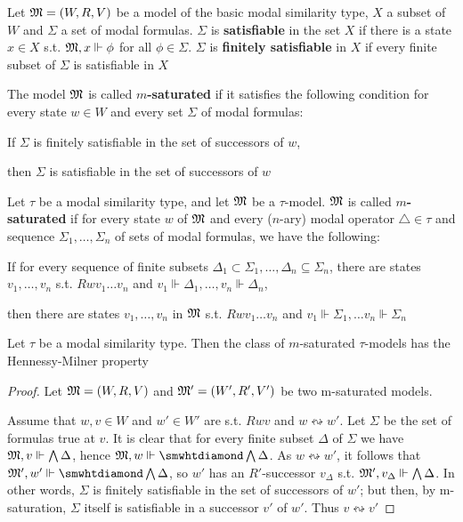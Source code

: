 \documentclass[11pt]{article}
\begin{document}
\begin{definition}[M-saturation]
Let \(\mathfrak{M}=(W,R,V)\) be a model of the basic modal similarity type, \(X\) a
subset of \(W\) and \(\Sigma\) a set of modal formulas. \(\Sigma\) is \textbf{satisfiable} in the set
\(X\) if there is a state \(x\in X\) s.t. \(\mathfrak{M},x\Vdash\phi\) for all
\(\phi\in\Sigma\). \(\Sigma\) is \textbf{finitely satisfiable} in \(X\) if every finite subset
of \(\Sigma\) is satisfiable in \(X\)

The model \(\mathfrak{M}\) is called \textbf{\(m\)-saturated} if it satisfies the following
condition for every state \(w\in W\) and every set \(\Sigma\) of modal formulas:

\begin{center}
If \(\Sigma\) is finitely satisfiable in the set of successors of \(w\), \par
then
\(\Sigma\) is satisfiable in the set of successors of \(w\)
\end{center}

Let \(\tau\) be a modal similarity type, and let \(\mathfrak{M}\) be a \(\tau\)-model.
\(\mathfrak{M}\) is called \textbf{\(m\)-saturated} if for every state \(w\) of \(\mathfrak{M}\) and
every (\(n\)-ary) modal operator \(\triangle\in\tau\) and sequence
\(\Sigma_1,\dots,\Sigma_n\) of sets of modal formulas, we have the
following:

\begin{center}
    If for every sequence of finite subsets \(\Delta_1\subset\Sigma_1,\dots,\Delta_n
    \subseteq\Sigma_n\), there are states \(v_1,\dots,v_n\) s.t.
    \(Rwv_1\dots v_n\) and \(v_1\Vdash\Delta_1,\dots,v_n\Vdash\Delta_n\),\par
    then there are states \(v_1,\dots,v_n\) in \(\mathfrak{M}\) s.t. \(Rwv_1\dots v_n\) and
    \(v_1\Vdash\Sigma_1,\dots v_n\Vdash\Sigma_n\)
\end{center}
\end{definition}

\begin{proposition}[]
\label{prop2.54}
Let \(\tau\) be a modal similarity type. Then the class of \(m\)-saturated
\(\tau\)-models has the Hennessy-Milner property
\end{proposition}

\begin{proof}
Let \(\mathfrak{M}=(W,R,V)\)  and \(\mathfrak{M}'=(W',R',V')\) be two m-saturated models.

Assume that \(w,v\in W\) and \(w'\in W'\) are s.t. \(Rwv\) and
\(w\leftrightsquigarrow w'\). Let \(\Sigma\) be the set of formulas true at \(v\). It
is clear that for every finite subset \(\Delta\) of \(\Sigma\) we have
\(\mathfrak{M},v\Vdash\bigwedge\Delta\), hence
\(\fM,w\Vdash\diamond\bigwedge\Delta\). As \(w\leftrightsquigarrow w'\), it
follows that \(\fM',w'\Vdash\diamond\bigwedge\Delta\), so \(w'\) has an
\(R'\)-successor \(v_\Delta\) s.t. \(\mathfrak{M}',v_\Delta\Vdash\bigwedge\Delta\).
In other words, \(\Sigma\) is finitely satisfiable in the set of successors of
\(w'\); but then, by m-saturation, \(\Sigma\) itself is satisfiable in a successor
\(v'\) of \(w'\). Thus \(v\leftrightsquigarrow v'\)
\end{proof}
\end{document}
